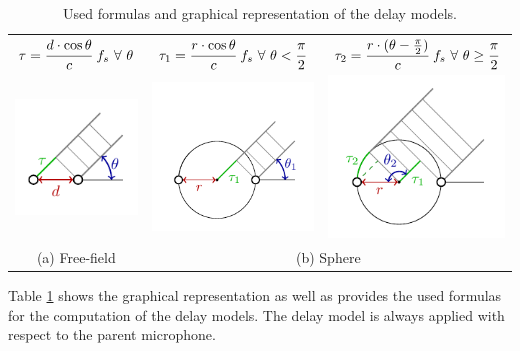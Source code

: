 \begin{table} [H]
\begin{center}
\begin{tabular}{c c c}
$\tau = \cfrac{d\cdot \cos\theta}{c}~f_s~\forall~\theta$ &
$\tau_1 = \cfrac{r\cdot \cos\theta}{c}~f_s~\forall~\theta<\cfrac{\pi}{2}$ &
$\tau_2 = \cfrac{r\cdot(\theta-\frac{\pi}{2})}{c}~f_s~\forall~\theta\geq\cfrac{\pi}{2}$\\ 
\includegraphics[width=.3\textwidth]{micarray_free_field.pdf} &
\includegraphics[width=.3\textwidth]{micarray_sphere1.pdf} &
\includegraphics[width=.3\textwidth]{micarray_sphere2.pdf}\\
(a) Free-field & \multicolumn{2}{c}{(b) Sphere}
\end{tabular}
\caption{Used formulas and graphical representation of the delay models.}
\label{Tab_delaymodels}
\end{center}
\end{table}

Table \ref{Tab_delaymodels} shows the graphical representation as well as provides the used
formulas for the computation of the delay models. The delay model is always applied with
respect to the parent microphone.





